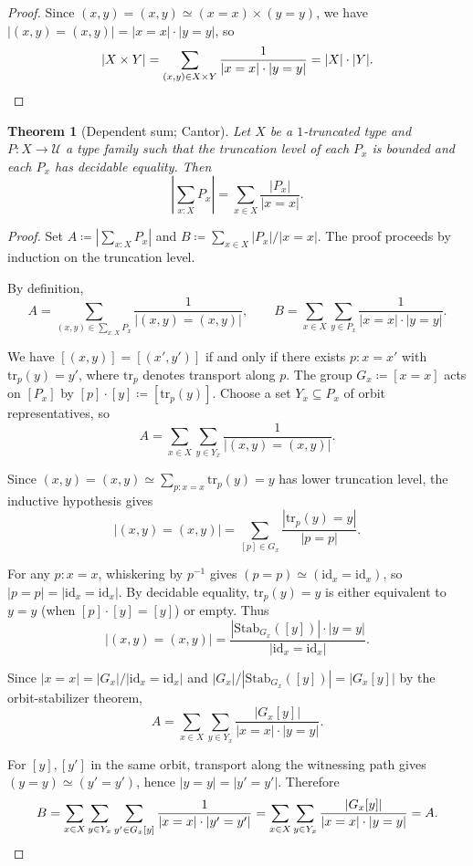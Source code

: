\documentclass[12pt]{amsart}
\newcommand{\U}{\mathcal{U}}
\newcommand{\Id}{\mathrm{id}}
\newcommand{\tr}{\mathrm{tr}}
\newcommand{\Stab}{\mathrm{Stab}}
\theoremstyle{plain}
\newtheorem{theorem}{Theorem}[section]
\theoremstyle{definition}
\theoremstyle{remark}
\begin{document}
\begin{proof}
Since $(x,y)=(x,y)\simeq (x=x)\times(y=y)$, we have $|(x,y)=(x,y)| = |x=x|\cdot|y=y|$, so
\[
|X\times Y| = \sum_{(x,y)\in X\times Y}\frac{1}{|x=x|\cdot|y=y|} = |X|\cdot|Y|.\qedhere
\]
\end{proof}

\begin{theorem}[Dependent sum; Cantor]\label{thm:depsum}
Let $X$ be a $1$-truncated type and $P:X\to\U$ a type family such that the truncation level of each $P_x$ is bounded and each $P_x$ has decidable equality. Then
\[
\left|\sum_{x:X}P_x\right| = \sum_{x\in X}\frac{|P_x|}{|x=x|}.
\]
\end{theorem}

\begin{proof}
Set $A \coloneqq |\sum_{x:X}P_x|$ and $B \coloneqq \sum_{x\in X}|P_x|/|x=x|$. The proof proceeds by induction on the truncation level.

By definition,
\[
A = \sum_{(x,y)\in\sum_{x:X}P_x}\frac{1}{|(x,y)=(x,y)|},\qquad B = \sum_{x\in X}\sum_{y\in P_x}\frac{1}{|x=x|\cdot|y=y|}.
\]

We have $[(x,y)]=[(x',y')]$ if and only if there exists $p:x=x'$ with $\tr_p(y)=y'$, where $\tr_p$ denotes transport along $p$. The group $G_x \coloneqq [x=x]$ acts on $[P_x]$ by $[p]\cdot[y] \coloneqq [\tr_p(y)]$. Choose a set $Y_x\subseteq P_x$ of orbit representatives, so
\[
A = \sum_{x\in X}\sum_{y\in Y_x}\frac{1}{|(x,y)=(x,y)|}.
\]

Since $(x,y)=(x,y)\simeq\sum_{p:x=x}\tr_p(y)=y$ has lower truncation level, the inductive hypothesis gives
\[
|(x,y)=(x,y)| = \sum_{[p]\in G_x}\frac{|\tr_p(y)=y|}{|p=p|}.
\]

For any $p:x=x$, whiskering by $p^{-1}$ gives $(p=p)\simeq(\Id_x=\Id_x)$, so $|p=p|=|\Id_x=\Id_x|$. By decidable equality, $\tr_p(y)=y$ is either equivalent to $y=y$ (when $[p]\cdot[y]=[y]$) or empty. Thus
\[
|(x,y)=(x,y)| = \frac{|\Stab_{G_x}([y])|\cdot|y=y|}{|\Id_x=\Id_x|}.
\]

Since $|x=x|=|G_x|/|\Id_x=\Id_x|$ and $|G_x|/|\Stab_{G_x}([y])|=|G_x[y]|$ by the orbit-stabilizer theorem,
\[
A = \sum_{x\in X}\sum_{y\in Y_x}\frac{|G_x[y]|}{|x=x|\cdot|y=y|}.
\]

For $[y],[y']$ in the same orbit, transport along the witnessing path gives $(y=y)\simeq(y'=y')$, hence $|y=y|=|y'=y'|$. Therefore
\[
B = \sum_{x\in X}\sum_{y\in Y_x}\sum_{y'\in G_x[y]}\frac{1}{|x=x|\cdot|y'=y'|} = \sum_{x\in X}\sum_{y\in Y_x}\frac{|G_x[y]|}{|x=x|\cdot|y=y|} = A.\qedhere
\]
\end{proof}
\end{document}
